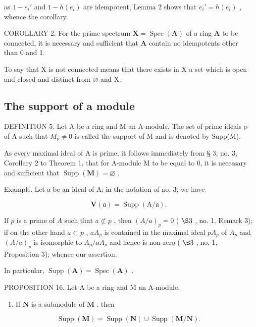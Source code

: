 as \(1 - e_i'\) and \(1 - h(e_i)\) are idempotent, Lemma 2 shows that \(e_i' = h(e_i)\) , whence the corollary.

COROLLARY 2. For the prime spectrum \(\mathbf{X} = \operatorname{Spec}(\mathbf{A})\) of a ring \(\mathbf{A}\) to be connected, it is necessary and sufficient that \(\mathbf{A}\) contain no idempotents other than 0 and 1.

To say that X is not connected means that there exists in X a set which is open and closed and distinct from \(\varnothing\) and X.

\subsection{The support of a module}

DEFINITION 5. Let A be a ring and M an A-module. The set of prime ideals p of A such that \(M_{p} \neq 0\) is called the support of M and is denoted by Supp(M).

As every maximal ideal of A is prime, it follows immediately from § 3, no. 3, Corollary 2 to Theorem 1, that for A-module M to be equal to 0, it is necessary and sufficient that \(\operatorname{Supp}(\mathbf{M}) = \varnothing\) .

Example. Let a be an ideal of A; in the notation of no. 3, we have

\[
\mathbf {V} (\mathfrak {a}) = \operatorname{Supp} (\mathrm{A} / \mathfrak {a}).\tag{9}
\]

If \(p\) is a prime of \(A\) such that \(a \not\subset p\) , then \((A/a)_p = 0\) ( \(\S 3\) , no. 1, Remark 3); if on the other hand \(a \subset p\) , \(aA_p\) is contained in the maximal ideal \(pA_p\) of \(A_p\) and \((A/a)_p\) is isomorphic to \(A_p/aA_p\) and hence is non-zero ( \(\S 3\) , no. 1, Proposition 3); whence our assertion.

In particular, \(\operatorname{Supp}(\mathbf{A}) = \operatorname{Spec}(\mathbf{A})\) .

PROPOSITION 16. Let A be a ring and M an A-module.

\begin{enumerate}
\def\labelenumi{(\roman{enumi})}
\tightlist
\item
  If \(\mathbf{N}\) is a submodule of \(\mathbf{M}\) , then
\end{enumerate}

\[
\operatorname{Supp} (\mathbf {M}) = \operatorname{Supp} (\mathbf {N}) \cup \operatorname{Supp} (\mathbf {M} / \mathbf {N}).
\]

